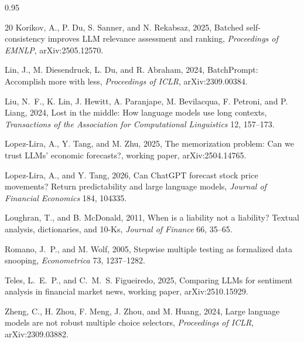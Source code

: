 \documentclass[11pt]{article}
\begin{document}
\begin{spacing}{0.95}
\begin{thebibliography}{20}
Korikov, A., P. Du, S. Sanner, and N. Rekabsaz, 2025, Batched self-consistency improves LLM relevance assessment and ranking, \emph{Proceedings of EMNLP}, arXiv:2505.12570.

Lin, J., M. Diesendruck, L. Du, and R. Abraham, 2024, BatchPrompt: Accomplish more with less, \emph{Proceedings of ICLR}, arXiv:2309.00384.

Liu, N.~F., K. Lin, J. Hewitt, A. Paranjape, M. Bevilacqua, F. Petroni, and P. Liang, 2024, Lost in the middle: How language models use long contexts, \emph{Transactions of the Association for Computational Linguistics} 12, 157--173.

Lopez-Lira, A., Y. Tang, and M. Zhu, 2025, The memorization problem: Can we trust LLMs' economic forecasts?, working paper, arXiv:2504.14765.

Lopez-Lira, A., and Y. Tang, 2026, Can ChatGPT forecast stock price movements? Return predictability and large language models, \emph{Journal of Financial Economics} 184, 104335.

Loughran, T., and B. McDonald, 2011, When is a liability not a liability? Textual analysis, dictionaries, and 10-Ks, \emph{Journal of Finance} 66, 35--65.

Romano, J.~P., and M. Wolf, 2005, Stepwise multiple testing as formalized data snooping, \emph{Econometrica} 73, 1237--1282.

Teles, L.~E.~P., and C.~M.~S. Figueiredo, 2025, Comparing LLMs for sentiment analysis in financial market news, working paper, arXiv:2510.15929.

Zheng, C., H. Zhou, F. Meng, J. Zhou, and M. Huang, 2024, Large language models are not robust multiple choice selectors, \emph{Proceedings of ICLR}, arXiv:2309.03882.

\end{thebibliography}
\end{spacing}
\end{document}

